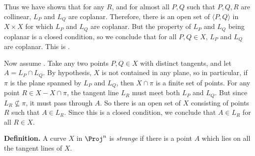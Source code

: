 {{Thus we have shown that for any $R$, and for almost all $P,Q$ such that $P,Q,R$ are collinear, $L_P$ and $L_Q$ are coplanar. Therefore, there is an open set of $\langle P,Q\rangle$ in $X\times X$ for which $L_P$ and $L_Q$ are coplanar. But the property of $L_P$ and $L_Q$ being coplanar is a closed condition, so we conclude that for all $P,Q\in X$, $L_P$ and $L_Q$ are coplanar. This is .}

Now assume . Take any two points $P,Q\in X$ with distinct tangents, and let $A=L_P\cap L_Q$. By hypothesis, $X$ is not contained in any plane, so in particular, if $\pi$ is the plane spanned by $L_P$ and $L_Q$, then $X\cap\pi$ is a finite set of points. For any point $R\in X-X\cap\pi$, the tangent line $L_R$ must meet both $L_P$ and $L_Q$. But since $L_R\nsubseteq\pi$, it must pass through $A$. So there is an open set of $X$ consisting of points $R$ such that $A\in L_R$. Since this is a closed condition, we conclude that $A\in L_R$ for all $R\in X$.

\medskip
\noindent\textbf{Definition.} A curve $X$ in $\Proj^n$ is \emph{strange} if there is a point $A$ which lies on all the tangent lines of $X$.
}
